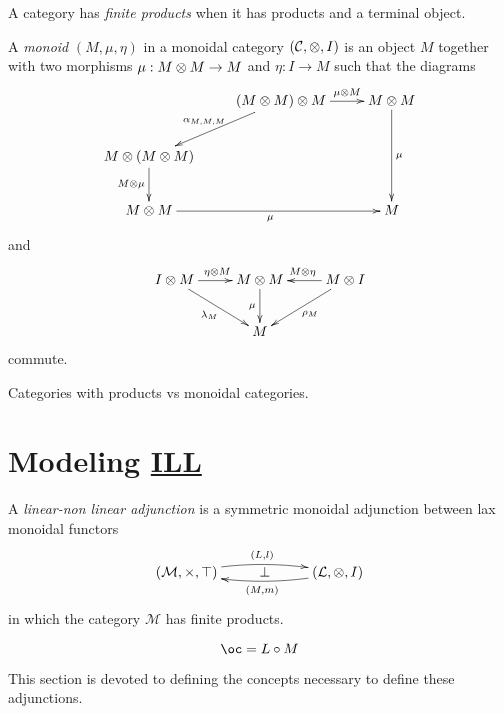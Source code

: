 A category has \emph{finite products} when it has products and a terminal object.

\begin{definition}[Monoid]
A \emph{monoid} $(M,\mu,\eta)$ in a monoidal category $(\mathcal{C},\otimes,I)$ is an object $M$ together with two morphisms $\mu:M\otimes M \to M$ and $\eta:I\to M$
such that the diagrams
\begin{equation*}
\xymatrix{
& (M\tens M)\tens M\ar[dl]_{\alpha_{M,M,M}}\ar[r]^-{\mu\tens M}& M\tens M\ar[dd]^{\mu}\\
M\tens(M\tens M)\ar[d]_{M\tens\mu}& & \\
M\tens M\ar[rr]_{\mu}& & M\\
}
\end{equation*}
and
\begin{equation*}
\xymatrix{
I\tens M\ar[r]^{\eta\tens M}\ar[dr]_{\lambda_M}& M\tens M\ar[d]_\mu& \ar[l]_{M\tens\eta}\ar[dl]^{\rho_M}M\tens I\\
& M& 
}
\end{equation*}
commute.
\end{definition}

\begin{property}
Categories with products vs monoidal categories.
\end{property}


\section{\texorpdfstring{Modeling \hyperref[intuitionistic-linear-logic]{ILL}}{Modeling ILL}}\label{modeling-ill}

\begin{definition}
A \emph{linear-non linear adjunction} is a symmetric monoidal adjunction between lax monoidal functors
\begin{equation*}
\xymatrix{
(\mathcal{M},\times,\top)\ar@/^/[rr]^{(L,l)}& \bot& \ar@/^/[ll]^{(M,m)}(\mathcal{L},\otimes,I)
}
\end{equation*}
in which the category $\mathcal{M}$ has finite products.
\end{definition}

\[\oc=L\circ M\]

This section is devoted to defining the concepts necessary to define
these adjunctions.

